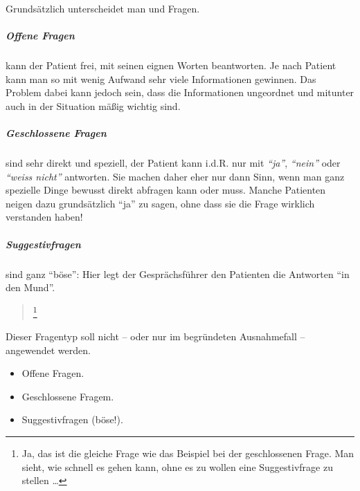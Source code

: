 {
Grundsätzlich unterscheidet man  und  Fragen. 

\subparagraph{Offene Fragen} kann der Patient frei, mit seinen eignen Worten
beantworten. Je nach Patient kann man so mit wenig Aufwand sehr viele
Informationen gewinnen. Das Problem dabei kann jedoch sein, dass die
Informationen ungeordnet und mitunter auch in der Situation mäßig wichtig sind. 

\begin{quote}
  
\end{quote}

\subparagraph{Geschlossene Fragen} sind sehr direkt und speziell, der Patient
kann i.d.R. nur mit \emph{"`ja"'}, \emph{"`nein"'} oder \emph{"`weiss nicht"'} antworten.
Sie machen daher eher nur dann Sinn, wenn man ganz spezielle Dinge bewusst
direkt abfragen kann oder muss.  Manche Patienten neigen dazu
grundsätzlich "`ja"' zu sagen, ohne dass sie die Frage wirklich verstanden
haben!

\begin{quote}
  
\end{quote}

\subparagraph{Suggestivfragen} sind ganz "`böse"': Hier
legt der Gesprächsführer den Patienten die Antworten "`in den Mund"'. 

\begin{quote}
  
  \footnote{Ja, das ist die gleiche Frage wie
  das Beispiel bei der geschlossenen Frage. Man sieht, wie schnell es gehen kann,
  ohne es zu wollen eine Suggestivfrage zu stellen \ldots}
\end{quote}

Dieser Fragentyp
soll nicht -- oder nur im begründeten Ausnahmefall -- angewendet werden. 

}
{
\begin{itemize}
    \item Offene Fragen.
    \item Geschlossene Fragem.
    \item Suggestivfragen (böse!).
\end{itemize}
}

